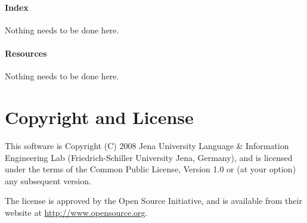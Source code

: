 \documentclass[11pt,a4paper,halfparskip]{scrartcl}
\begin{document}
\paragraph{Index}
Nothing needs to be done here.

\paragraph{Resources}
Nothing needs to be done here.


\section{Copyright and License}
This software is Copyright (C) 2008 Jena University Language \& Information
Engineering Lab (Friedrich-Schiller University Jena, Germany), and is
licensed under the terms of the Common Public License, Version 1.0 or (at
your option) any subsequent version.

The license is approved by the Open Source Initiative, and is
available from their website at \url{http://www.opensource.org}.


%
\end{document}
